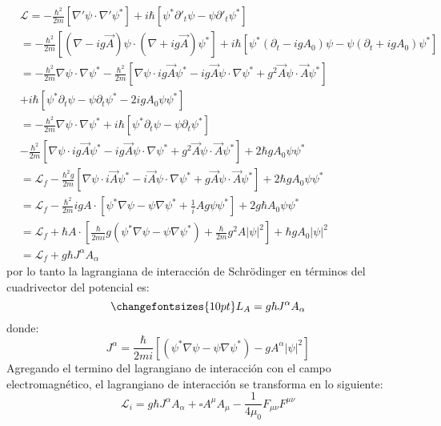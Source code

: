 \begin{align*}
    &\mathcal{L} = -\frac{\hbar^2}{2m}\left[ {\nabla}'\psi \cdot {\nabla}' \psi^*\right] + i\hbar \left[\psi^* {\partial}'_t \psi - \psi {\partial}'_t \psi^*\right]\\
    &= -\frac{\hbar^2}{2m}\left[ \left(\nabla - ig\vec{A}\right)\psi \cdot \left( \nabla + ig\vec{A}\right) \psi^*\right] + i\hbar \left[\psi^* \left(\partial_t -igA_0\right) \psi - \psi \left(\partial_t +igA_0\right) \psi^*\right]\\
    &=- \frac{\hbar^2}{2m} \nabla \psi \cdot \nabla \psi^* -\frac{\hbar^2}{2m}\left[\nabla \psi \cdot ig\vec{A} \psi^* - ig \vec{A}\psi \cdot \nabla \psi^* + g^2 \vec{A}\psi \cdot \vec{A} \psi^* \right]\\
    &+ i\hbar \left[\psi^*\partial_t \psi - \psi \partial_t \psi^* -2igA_0 \psi \psi^* \right]\\
    &=- \frac{\hbar^2}{2m} \nabla \psi \cdot \nabla \psi^* + i\hbar \left[\psi^*\partial_t \psi - \psi \partial_t \psi^* \right]\\
    &-\frac{\hbar^2}{2m}\left[\nabla \psi \cdot ig\vec{A} \psi^* - ig \vec{A}\psi \cdot \nabla \psi^* + g^2 \vec{A}\psi \cdot \vec{A} \psi^* \right]+ 2\hbar gA_0 \psi \psi^*\\
    & = \mathcal{L}_f -\frac{\hbar^2g}{2m}\left[\nabla \psi \cdot i\vec{A} \psi^* - i\vec{A}\psi \cdot \nabla \psi^* + g \vec{A}\psi \cdot \vec{A} \psi^* \right]+ 2\hbar gA_0 \psi \psi^*\\
    &= \mathcal{L}_f - \frac{\hbar^2}{2m}igA \cdot \left[\psi^* \nabla \psi - \psi \nabla \psi^* + \frac{1}{i}Ag \psi \psi^*\right] +2 g \hbar  A_0 \psi \psi^*\\
    &= \mathcal{L}_f + \hbar A \cdot \left[\frac{\hbar}{2mi}g \left(\psi^* \nabla \psi - \psi \nabla \psi^* \right)+ \frac{\hbar}{2m} g^2 A |\psi|^2 \right] + \hbar g A_0 |\psi|^2\\
    &= \mathcal{L}_f + g\hbar J^\alpha A_\alpha
\end{align*}
por lo tanto la lagrangiana de interacción de Schr\"odinger en términos del cuadrivector del potencial es:
\begin{equation}
    \changefontsizes{10pt}
    L_A=g\hbar J^\alpha A_\alpha
    \label{eq:den_lag_a}
\end{equation}
donde:
\begin{equation*}
    J^\alpha = \frac{\hbar}{2mi} \left[\left(\psi^* \nabla \psi - \psi \nabla \psi^* \right)-gA^\alpha |\psi|^2\right]
\end{equation*}
Agregando el termino del lagrangiano de interacción con el campo electromagnético, el lagrangiano de interacción se transforma en lo siguiente:
\begin{equation}
    \mathcal{L}_i= g\hbar J^\alpha A_\alpha + \square A^\mu A_\mu - \frac{1}{4\mu_0} F_{\mu \nu}F^{\mu \nu}
\end{equation}